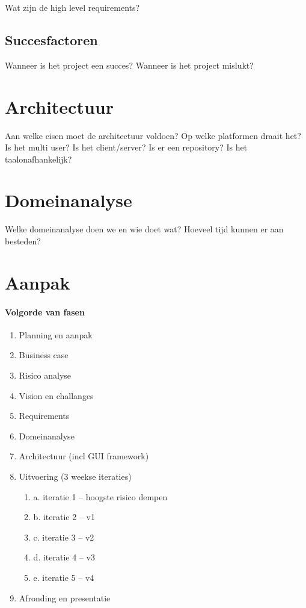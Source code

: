 \documentclass[a4paper,11pt,twoside,draft]{article}
\begin{document}
Wat zijn de high level requirements?

\subsection{Succesfactoren}
Wanneer is het project een succes?
Wanneer is het project mislukt?

\section{Architectuur}
Aan welke eisen moet de architectuur voldoen?
Op welke platformen draait het?
Is het multi user? Is het client/server? Is er een repository?
Is het taalonafhankelijk?

\section{Domeinanalyse}

Welke domeinanalyse doen we en wie doet wat? Hoeveel tijd kunnen er aan besteden?

\section{Aanpak}

\paragraph{Volgorde van fasen}

\begin{enumerate}
 \item Planning en aanpak
 \item Business case
 \item Risico analyse
 \item Vision en challanges
 \item Requirements
 \item Domeinanalyse
 \item Architectuur (incl GUI framework)
 \item Uitvoering (3 weekse iteraties)
 \begin{enumerate}
  \item a. iteratie 1 -- hoogste risico dempen
  \item b. iteratie 2 -- v1
  \item c. iteratie 3 -- v2
  \item d. iteratie 4 -- v3
  \item e. iteratie 5 -- v4
 \end{enumerate}
\item Afronding en presentatie
\end{enumerate}
\end{document}
